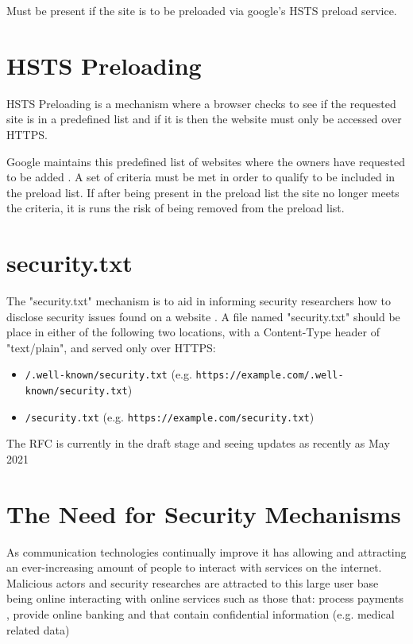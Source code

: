 \documentclass{mscreport}
\begin{document}
Must be present if the site is to be preloaded via google's HSTS preload service.

\section{HSTS Preloading}
HSTS Preloading is a mechanism where a browser checks to see if the requested site is in a predefined list and if it is then the website must only be accessed over HTTPS.

\noindent \vspace{0.3cm}
Google maintains this predefined list of websites where the owners have requested to be added \cite{Hodges2012-pe}.
A set of criteria must be met in order to qualify to be included in the preload list. If after being present in the preload list the site no longer meets the criteria, it is runs the risk of being removed from the preload list.

\newpage

\section{security.txt}
The "security.txt" mechanism is to aid in informing security researchers how to disclose security issues found on a website \cite{Foudil2021-vh}.
A file named "security.txt" should be place in either of the following two locations, with a Content-Type header of "text/plain", and served only over HTTPS:

\begin{itemize}
	\setlength\itemsep{0.1em}
	\item \texttt{/.well-known/security.txt} (e.g. \texttt{https://example.com/.well-known/security.txt})
	\item \texttt{/security.txt} (e.g. \texttt{https://example.com/security.txt})
\end{itemize}

\noindent \vspace{0.3cm}
The RFC is currently in the draft stage and seeing updates as recently as May 2021


\newpage

\section{The Need for Security Mechanisms}

As communication technologies continually improve it has allowing and attracting an ever-increasing amount of people to interact with services on the internet. Malicious actors and security researches are attracted to this large user base being online interacting with online services such as those that: process payments \cite{Herman2019-zb}, provide online banking \cite{Gezer2019-oy} and that contain confidential information (e.g. medical related data) \cite{Mrdjenovich2020-vz}
\end{document}

